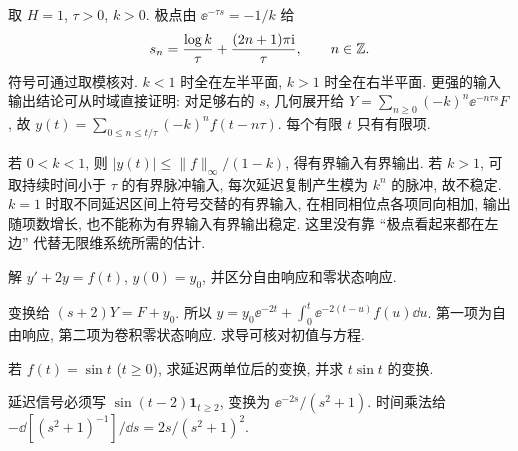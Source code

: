 取 $H=1$, $\tau>0$, $k>0$. 极点由 $\ee^{-\tau s}=-1/k$ 给
\[
s_n=\frac{\log k}{\tau}+\frac{(2n+1)\pi\mathrm i}{\tau},\qquad n\in\mathbb Z.
\]
符号可通过取模核对. $k<1$ 时全在左半平面, $k>1$ 时全在右半平面. 更强的输入输出结论可从时域直接证明: 对足够右的 $s$, 几何展开给 $Y=\sum_{n\ge0}(-k)^n\ee^{-n\tau s}F$, 故 $y(t)=\sum_{0\le n\le t/\tau}(-k)^nf(t-n\tau)$. 每个有限 $t$ 只有有限项.

若 $0<k<1$, 则 $|y(t)|\le\|f\|_\infty/(1-k)$, 得有界输入有界输出. 若 $k>1$, 可取持续时间小于 $\tau$ 的有界脉冲输入, 每次延迟复制产生模为 $k^n$ 的脉冲, 故不稳定. $k=1$ 时取不同延迟区间上符号交替的有界输入, 在相同相位点各项同向相加, 输出随项数增长, 也不能称为有界输入有界输出稳定. 这里没有靠 ``极点看起来都在左边'' 代替无限维系统所需的估计.

\begin{exercise}
解 $y'+2y=f(t)$, $y(0)=y_0$, 并区分自由响应和零状态响应.
\end{exercise}
\begin{solution}
变换给 $(s+2)Y=F+y_0$. 所以 $y=y_0\ee^{-2t}+\int_0^t\ee^{-2(t-u)}f(u)\dd u$. 第一项为自由响应, 第二项为卷积零状态响应. 求导可核对初值与方程.
\end{solution}
\begin{exercise}
若 $f(t)=\sin t$ ($t\ge0$), 求延迟两单位后的变换, 并求 $t\sin t$ 的变换.
\end{exercise}
\begin{solution}
延迟信号必须写 $\sin(t-2)\mathbf1_{t\ge2}$, 变换为 $\ee^{-2s}/(s^2+1)$. 时间乘法给 $-\dd[(s^2+1)^{-1}]/\dd s=2s/(s^2+1)^2$.
\end{solution}
